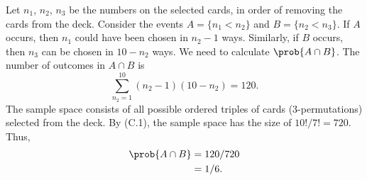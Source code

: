 Let $n_1$, $n_2$, $n_3$ be the numbers on the selected cards, in order of removing the cards from the deck.
Consider the events $A=\{n_1<n_2\}$ and $B=\{n_2<n_3\}$.
If $A$ occurs, then $n_1$ could have been chosen in $n_2-1$ ways.
Similarly, if $B$ occurs, then $n_3$ can be chosen in $10-n_2$ ways.
We need to calculate $\prob{A\cap B}$.
The number of outcomes in $A\cap B$ is
\[
    \sum_{n_2=1}^{10}(n_2-1)(10-n_2) = 120.
\]
The sample space consists of all possible ordered triples of cards (3-permutations) selected from the deck.
By (C.1), the sample space has the size of $10!/7!=720$.
Thus,
\begin{align*}
    \prob{A\cap B} &= 120/720 \\
    &= 1/6.
\end{align*}
